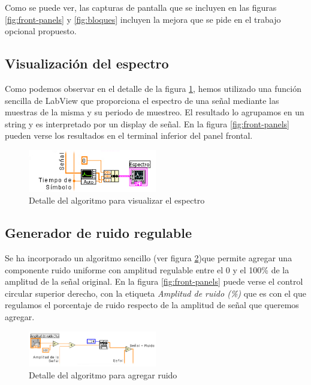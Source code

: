 \documentclass[10pt,a4paper,catalan]{article}
\begin{document}
Como se puede ver, las capturas de pantalla que se incluyen en las figuras \ref{fig:front-panels} y \ref{fig:bloques} incluyen la mejora que se pide en el trabajo opcional propuesto.

\subsection{Visualizaci\'on del espectro}

Como podemos observar en el detalle de la figura \ref{fig:detalle-espectro}, hemos utilizado una funci\'on sencilla de LabView que proporciona el espectro de una se\~nal mediante las muestras de la misma y su periodo de muestreo. El resultado lo agrupamos en un string y es interpretado por un display de se\~nal. En la figura \ref{fig:front-panels} pueden verse los resultados en el terminal inferior del panel frontal.

\begin{figure}[H]
 \centering
 \includegraphics[width=0.5\textwidth]{capturas/detalle-espectro}
 \caption{Detalle del algoritmo para visualizar el espectro}
 \label{fig:detalle-espectro}
\end{figure}


\subsection{Generador de ruido regulable}

Se ha incorporado un algoritmo sencillo (ver figura \ref{fig:detalle-ruido})que permite agregar una componente ruido uniforme con amplitud regulable entre el 0 y el 100\% de la amplitud de la se\~nal original. En la figura \ref{fig:front-panels} puede verse el control circular superior derecho, con la etiqueta \emph{Amplitud de ruido (\%)} que es con el que regulamos el porcentaje de ruido respecto de la amplitud de se\~nal que queremos agregar. 

\begin{figure}[H]
 \centering
 \includegraphics[width=0.5\textwidth]{capturas/detalle-ruido}
 \caption{Detalle del algoritmo para agregar ruido}
 \label{fig:detalle-ruido}
\end{figure}
\end{document}
